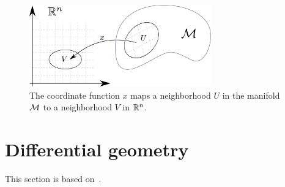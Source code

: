 
\begin{figure}[H]
    \centering
    \includegraphics[width=0.7\textwidth]{figurer/coordinate_function.pdf}
    \caption{
        The coordinate function $x$ maps a neighborhood $U$ in the manifold $\mathcal{M}$ to a neighborhood $V$ in $\mathbb{R}^n$.
        }
    \label{fig: coordinate function}
\end{figure}



\section{Differential geometry}
\label{section: differential geometry}


This section is based on~\autocite{carrollSpacetimeGeometryIntroduction2019,leeIntroductionSmoothManifolds2003d}.


